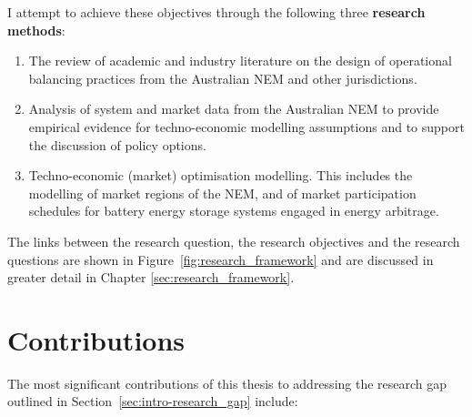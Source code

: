 \documentclass[12pt,a4paper,]{report}
\providecommand{\tightlist}{%
  \setlength{\itemsep}{0pt}\setlength{\parskip}{0pt}}
\begin{document}
I attempt to achieve these objectives through the following three
\textbf{research methods}:

\begin{enumerate}
\def\labelenumi{\arabic{enumi}.}
\tightlist
\item
  The review of academic and industry literature on the design of
  operational balancing practices from the Australian NEM and other
  jurisdictions.
\item
  Analysis of system and market data from the Australian NEM to provide
  empirical evidence for techno-economic modelling assumptions and to
  support the discussion of policy options.
\item
  Techno-economic (market) optimisation modelling. This includes the
  modelling of market regions of the NEM, and of market participation
  schedules for battery energy storage systems engaged in energy
  arbitrage.
\end{enumerate}

The links between the research question, the research objectives and the
research questions are shown in Figure~\ref{fig:research_framework} and
are discussed in greater detail in Chapter \ref{sec:research_framework}.

\hypertarget{contributions}{%
\section{Contributions}\label{contributions}}

The most significant contributions of this thesis to addressing the
research gap outlined in Section~\ref{sec:intro-research_gap} include:
\end{document}
